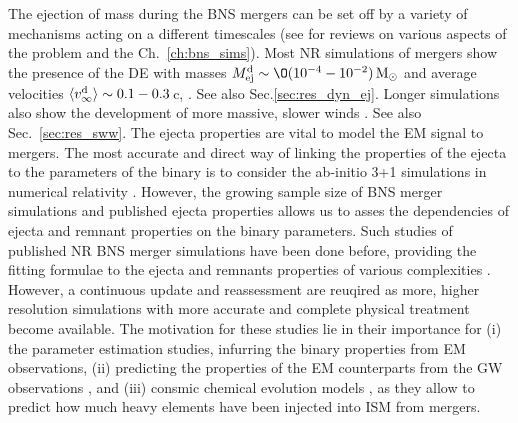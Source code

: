 
The ejection of mass during the \ac{BNS} mergers can be set off by a variety of mechanisms acting
on a different timescales 
(see
\citet{Metzger:2019zeh,Shibata:2019wef,Radice:2020ddv,Bernuzzi:2020tgt} for reviews on various aspects of the problem and the Ch.~\ref{ch:bns_sims}).
Most \ac{NR} simulations of mergers show the presence of the \ac{DE} with masses 
$\md\sim\O(10^{-4}-10^{-2})\,\Msun$ and average velocities $\langle v^{\text{d}}_\infty\rangle\sim0.1-0.3\,$c, 
\citep[see \eg][]{Rosswog:1998hy,Rosswog:2005su,Hotokezaka:2013iia,Bauswein:2013yna,Wanajo:2014wha,Sekiguchi:2015dma,Radice:2016dwd,Sekiguchi:2016bjd,Vincent:2019kor}. See also Sec.\ref{sec:res_dyn_ej}.
Longer simulations also show the development of more massive, slower winds 
\citep[see \eg][]{Dessart:2008zd,Fernandez:2014bra,Perego:2014fma,Just:2014fka,Kasen:2014toa,Metzger:2014ila,Martin:2015hxa,Wu:2016pnw,Siegel:2017nub,Fujibayashi:2017puw,Fahlman:2018llv,Metzger:2018uni,Fernandez:2018kax,Miller:2019dpt}. See also Sec.~\ref{sec:res_sww}.
The ejecta properties are vital to model the \ac{EM} signal to mergers. 
The most accurate and direct way of linking the properties of the ejecta to the parameters of the binary 
is to consider the ab-initio 3+1 simulations in numerical relativity
\citep[\eg][]{Hotokezaka:2012ze,Hotokezaka:2013iia,Wanajo:2014wha,Sekiguchi:2015dma,Dietrich:2015iva,Palenzuela:2015dqa,Bernuzzi:2015opx,Radice:2016dwd,Lehner:2016lxy,Sekiguchi:2016bjd,Radice:2018pdn,Vincent:2019kor,Perego:2019adq,Kiuchi:2019lls,Endrizzi:2019trv,Bernuzzi:2020txg}.
However, the growing sample size of \ac{BNS} merger simulations and published ejecta properties 
allows us to asses the dependencies of ejecta and remnant properties on the binary parameters.
Such studies of published \ac{NR} \ac{BNS} merger simulations have been done before, providing the 
fitting formulae to the ejecta and \pmerg{} remnants properties of various complexities 
\cite{Dietrich:2016fpt,Radice:2018pdn,Kruger:2020gig}. 
However, a continuous update and reassessment are reuqired as more, higher resolution simulations
with more accurate and complete physical treatment become available. 
The motivation for these studies lie in their importance for (i) the parameter estimation studies,
infurring the binary properties from \ac{EM} observations,
\citep[\eg][]{Radice:2017lry,Perego:2017wtu,Coughlin:2018fis,Coughlin:2019zqi} 
(ii) predicting the properties of the \ac{EM} counterparts from the \ac{GW} observations 
\citep[\eg][]{Stachie:2021noh}, and (iii) consmic chemical evolution models 
\citep[\eg][]{Bonetti:2019fxj}, as they allow 
to predict how much heavy elements have been injected into \ac{ISM} from mergers.


